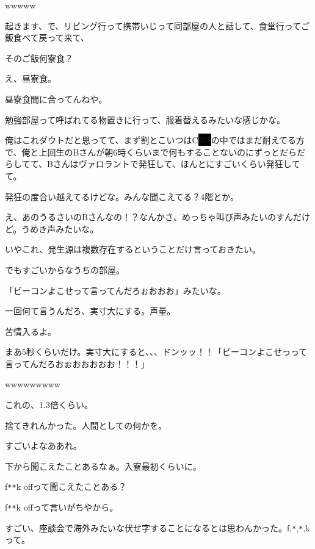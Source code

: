 \begin{multicols}{2}
  
wwwww

  
起きます、で、リビング行って携帯いじって同部屋の人と話して、食堂行ってご飯食べて戻って来て、

  
そのご飯何寮食？

  
え、昼寮食。

  
昼寮食間に合ってんねや。

  
勉強部屋って呼ばれてる物置きに行って、服着替えるみたいな感じかな。

  
俺はこれダウトだと思ってて、まず割とこいつはC\colorbox{black}{305}の中ではまだ耐えてる方で、俺と上回生のBさんが朝6時くらいまで何もすることないのにずっとだらだらしてて、Bさんはヴァロラントで発狂して、ほんとにすごいくらい発狂してて。

  
発狂の度合い越えてるけどな。みんな聞こえてる？4階とか。

  
え、あのうるさいのBさんなの！？なんかさ、めっちゃ叫び声みたいのすんだけど。うめき声みたいな。

  
いやこれ、発生源は複数存在するということだけ言っておきたい。

  
でもすごいからなうちの部屋。

  
「ビーコンよこせって言ってんだろぉおおお」みたいな。

  
一回何て言うんだろ、実寸大にする。声量。

  
苦情入るよ。

  
まあ5秒くらいだけ。実寸大にすると、、、{\LARGE ドンッッ！！「ビーコンよこせっって言ってんだろ}{\huge おぉおおおおお！！！」}

  
wwwwwwwww

  
これの、1.3倍くらい。

  
捨てきれんかった。人間としての何かを。

  
すごいよなああれ。

  
下から聞こえたことあるなぁ。入寮最初くらいに。

  
f\verb|**|k offって聞こえたことある？

  
f\verb|**|k offって言いがちやから。

  
すごい、座談会で海外みたいな伏せ字することになるとは思わんかった。f,\verb|*|,\verb|*|,kって。


\end{multicols}

